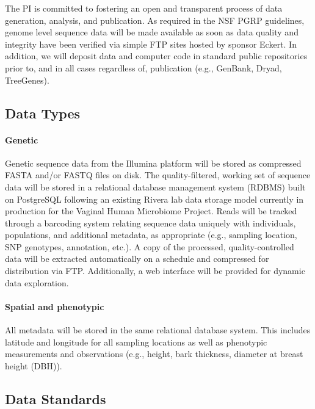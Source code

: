 \newpage


The PI is committed to fostering an open and transparent process of data generation, 
analysis, and publication. As required in the NSF PGRP guidelines, genome level sequence data will be made 
available as soon as data quality and integrity have been verified via simple FTP sites hosted by sponsor Eckert. 
In addition, we will deposit data and computer code in standard public repositories prior to, and in all cases 
regardless of, publication (e.g., GenBank, Dryad, TreeGenes).

\subsection*{Data Types}

\paragraph{Genetic}
Genetic sequence data from the Illumina platform will be stored as compressed FASTA and/or FASTQ files 
on disk. The quality-filtered, working set of sequence data will be stored in a relational database management system 
(RDBMS) built on PostgreSQL following an existing Rivera lab data storage model currently in production 
for the Vaginal Human Microbiome Project. Reads will be tracked through a barcoding system relating 
sequence data uniquely with individuals, populations, and additional metadata, as appropriate (e.g., sampling 
location, SNP genotypes, annotation, etc.).  A copy of the processed, quality-controlled data will be extracted 
automatically on a schedule and compressed for distribution via FTP.  Additionally, a web interface will be provided for 
dynamic data exploration.

\paragraph{Spatial and phenotypic}
All metadata will be stored in the same relational database system.  This includes latitude and longitude for all sampling
locations as well as phenotypic measurements and observations (e.g., height, bark thickness, diameter at breast height (DBH)).

\subsection*{Data Standards}

